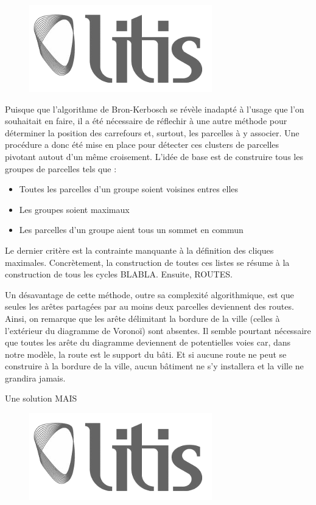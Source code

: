 \documentclass[12pt]{article}
\begin{document}
\begin{figure}
  \centering
  \includegraphics[width=.6\linewidth]{images/logo-litis.png}
  \caption{}
  \label{fig:construction-viaire2}
\end{figure}

Puisque que l'algorithme de Bron-Kerbosch se révèle inadapté à l'usage
que l'on souhaitait en faire, il a été nécessaire de réflechir à une
autre méthode pour déterminer la position des carrefours et, surtout,
les parcelles à y associer. Une procédure a donc été mise en place
pour détecter ces clusters de parcelles pivotant autout d'un même
croisement. L'idée de base est de construire tous les groupes de
parcelles tels que :

\begin{itemize}
\item{Toutes les parcelles d'un groupe soient voisines entres elles}
\item{Les groupes soient maximaux}
\item{Les parcelles d'un groupe aient tous un sommet en commun}
\end{itemize}

Le dernier critère est la contrainte manquante à la définition des
cliques maximales. Concrètement, la construction de toutes ces listes
se résume à la construction de tous les cycles BLABLA. Ensuite,
ROUTES.

Un désavantage de cette méthode, outre sa complexité algorithmique,
est que seules les arêtes partagées par au moins deux parcelles
deviennent des routes. Ainsi, on remarque que les arête délimitant la
bordure de la ville (celles à l'extérieur du diagramme de Voronoï)
sont absentes. Il semble pourtant nécessaire que toutes les arête du
diagramme deviennent de potentielles voies car, dans notre modèle, la
route est le support du bâti. Et si aucune route ne peut se construire
à la bordure de la ville, aucun bâtiment ne s'y installera et la ville
ne grandira jamais.

Une solution MAIS

\begin{figure}
  \centering
  \includegraphics[width=.6\linewidth]{images/logo-litis.png}
  \caption{}
  \label{fig:construction-viaire3}
\end{figure}
\end{document}
